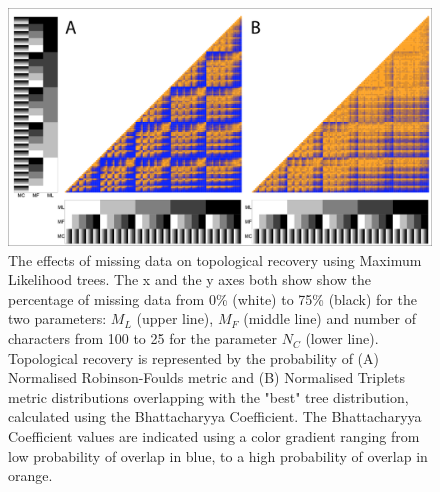 \documentclass[12pt,letterpaper]{article}
\begin{document}
\begin{figure} 
\centering
    \includegraphics[width=1\textwidth]{SupplementaryFigures/PairwiseComp-ML-RF+Tr-colour.png} %
    \caption{The effects of missing data on topological recovery using Maximum Likelihood trees. The x and the y axes both show show the percentage of missing data from 0\% (white) to 75\% (black) for the two parameters: $M_{L}$ (upper line), $M_{F}$ (middle line) and number of characters from 100 to 25 for the parameter $N_{C}$ (lower line). Topological recovery is represented by the probability of (A) Normalised Robinson-Foulds metric and (B) Normalised Triplets metric distributions overlapping with the "best" tree distribution, calculated using the Bhattacharyya Coefficient. The Bhattacharyya Coefficient values are indicated using a color gradient ranging from low probability of overlap in blue, to a high probability of overlap in orange.}
\label{Fig_Supp_paircomp_ML}
\end{figure} 
\end{document}
